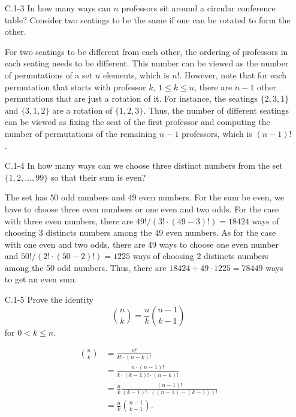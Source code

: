 \begin{enumerate}
\item[C.1{-}3] {In how many ways can $n$ professors sit around a circular
conference table? Consider two seatings to be the same if one can be rotated to
form the other.}

\begin{framed}
For two seatings to be different from each other, the ordering of professors in
each seating needs to be different. This number can be viewed as the number
of permutations of a set $n$ elements, which is $n!$. However, note that for
each permutation that starts with professor $k$, $1 \le k \le n$, there are
$n - 1$ other permutations that are just a rotation of it. For instance, the
seatings $\{2, 3, 1\}$ and $\{3, 1, 2\}$ are a rotation of $\{1, 2, 3\}$. Thus,
the number of different seatings can be viewed as fixing the seat of the first
professor and computing the number of permutations of the remaining $n - 1$
professors, which is $(n - 1)!$.
\end{framed}

\item[C.1{-}4] {In how many ways can we choose three distinct numbers from the
set $\{1, 2, \dots, 99\}$ so that their sum is even?}

\begin{framed}
The set has $50$ odd numbers and $49$ even numbers. For the sum be even, we have
to choose three even numbers or one even and two odds. For the case with three
even numbers, there are $49!/(3! \cdot (49 - 3)!) = 18424$ ways of choosing $3$
distincts numbers among the 49 even numbers. As for the case with one even and
two odds, there are 49 ways to choose one even number and
$50!/(2! \cdot (50 - 2)!) = 1225$ ways of choosing $2$ distincts numbers among the
50 odd numbers. Thus, there are $18424 + 49 \cdot 1225 = 78449$ ways to get an
even sum.
\end{framed}

\newpage

\item[C.1{-}5] {Prove the identity
\[
  \binom{n}{k} = \frac{n}{k} \binom{n - 1}{k - 1}
\]
for $0 < k \le n$.
}

\begin{framed}
\begin{equation*}
\begin{aligned}
  \binom{n}{k} &= \frac{n!}{k! \cdot (n - k)!}\\
               &= \frac{n \cdot (n - 1)!}{k \cdot (k - 1)! \cdot (n - k)!}\\
               &= \frac{n}{k} \frac{(n - 1)!}{(k - 1)! \cdot ((n - 1) - (k - 1))!}\\
               &= \frac{n}{k} \binom{n - 1}{k - 1}.
\end{aligned}
\end{equation*}
\end{framed}


\end{enumerate}

